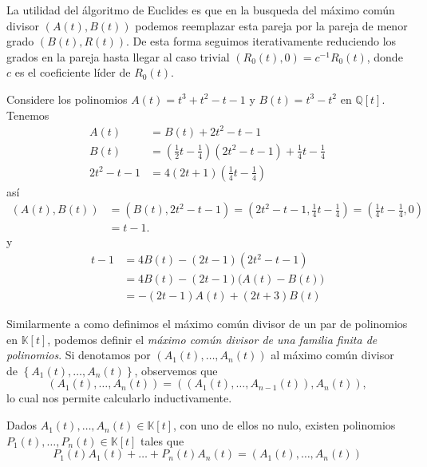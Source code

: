 \begin{obs}
La utilidad del álgoritmo de Euclides es que en la busqueda del máximo común divisor $\left(A(t),B(t)\right)$ podemos reemplazar esta pareja por la pareja de menor grado $\left(B(t),R(t)\right)$. De esta forma seguimos iterativamente reduciendo los grados en la pareja hasta llegar al caso trivial $(R_0(t),0)=c^{-1}R_0(t)$, donde $c$ es el coeficiente líder de $R_0(t)$.
\end{obs}

\begin{ejem}\label{bez1}
Considere los polinomios $A(t)=t^3+t^2-t-1$ y $B(t)=t^3-t^2$  en $\mathbb{Q}[t]$. Tenemos
\begin{align*}
A(t) & = B(t) + 2t^2-t-1\\
B(t) & =\left(\frac{1}{2}t-\frac{1}{4}\right)(2t^2-t-1)+\frac{1}{4}t-\frac{1}{4}\\
2t^2-t-1 & = 4(2t+1)\left(\frac{1}{4}t-\frac{1}{4}\right)
\end{align*}
así
\begin{align*}
(A(t),B(t)) & = (B(t),2t^2-t-1) = (2t^2-t-1,\frac{1}{4}t-\frac{1}{4}) = (\frac{1}{4}t-\frac{1}{4},0)\\
 & = t-1. 
\end{align*}
y
\begin{align*}
t-1 & = 4B(t)-(2t-1)(2t^2-t-1)\\
  & = 4B(t)-(2t-1)\big(A(t)-B(t)\big)\\
  & = -(2t-1)A(t)+(2t+3)B(t)
\end{align*}
\end{ejem}

\begin{obs}
Similarmente a como definimos el máximo común divisor de un par de polinomios en $\mathbb{K}[t]$, podemos definir el \emph{máximo común divisor de una familia finita de polinomios}. Si denotamos por $\left(A_1(t),\ldots,A_n(t)\right)$ al máximo común divisor de $\left\{A_1(t),\ldots,A_n(t)\right\}$, observemos que
\[
\left(A_1(t),\ldots,A_n(t)\right)=\left(\left(A_1(t),\ldots,A_{n-1}(t)\right), A_n(t)\right),
\]
lo cual nos permite calcularlo inductivamente.
\end{obs}

\begin{teo}
Dados $A_1(t),\ldots,A_n(t)\in \mathbb{K}[t]$, con uno de ellos no nulo, existen polinomios $P_1(t),\ldots,P_n(t)\in \mathbb{K}[t]$ tales que
\[
P_1(t)A_1(t)+\ldots+P_n(t)A_n(t)=\left(A_1(t),\ldots,A_n(t)\right)
\]
\end{teo}

